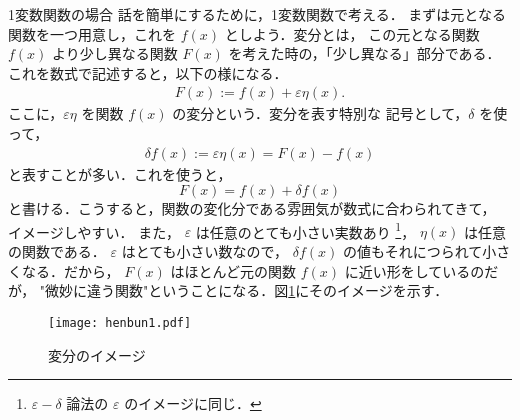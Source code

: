                \begin{mysmallsec}{1変数関数の場合}
                    話を簡単にするために，1変数関数で考える．
                    まずは元となる関数を一つ用意し，これを $f(x)$ としよう．変分とは，
                    この元となる関数 $f(x)$ より少し異なる関数 $F(x)$ を考えた時の，「少し異なる」部分である．
                    これを数式で記述すると，以下の様になる．
                        \begin{align}
                            F(x) := f(x) + \varepsilon \eta(x).
                        \end{align}
                    ここに，$\varepsilon \eta$ を関数 $f(x)$ の変分という．変分を表す特別な
                    記号として，$\delta$ を使って，
                        \begin{align}
                           \delta f(x) := \varepsilon \eta(x) = F(x) - f(x)
                        \end{align}
                    と表すことが多い．これを使うと，
                        \begin{equation*}
                            F(x) = f(x) + \delta f(x)
                        \end{equation*}
                    と書ける．こうすると，関数の変化分である雰囲気が数式に合わられてきて，
                    イメージしやすい．
                    また，
                    $\varepsilon$ は任意のとても小さい実数あり
                        \footnote{
                            $\varepsilon - \delta$ 論法の $\varepsilon$ のイメージに同じ．
                        }，
                    $\eta(x)$ は任意の関数である．
                    $\varepsilon$ はとても小さい数なので，
                    $\delta f(x)$ の値もそれにつられて小さくなる．だから，
                    $F(x)$ はほとんど元の関数 $f(x)$ に近い形をしているのだが，
                    "微妙に違う関数"ということになる．図\ref{fig:henbun1}にそのイメージを示す．
                        \begin{figure}[hbt]
                            \begin{center}
                                \texttt{[image: henbun1.pdf]}
                                \caption{変分のイメージ}
                                \label{fig:henbun1}
                            \end{center}
                        \end{figure}
                \end{mysmallsec}

